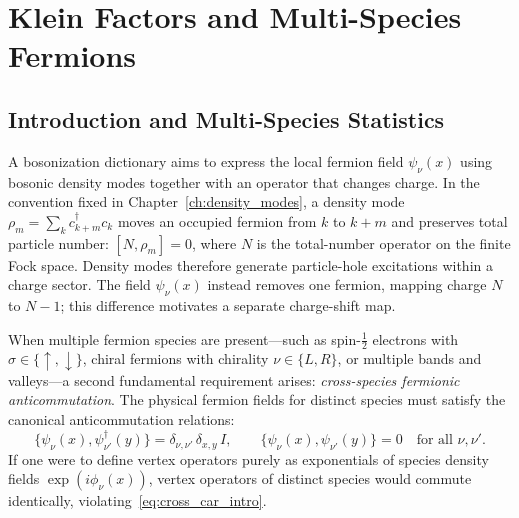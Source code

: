 \chapter{Klein Factors and Multi-Species Fermions}
\label{ch:klein_factors}

\section{Introduction and Multi-Species Statistics}

A bosonization dictionary aims to express the local fermion field $\psi_\nu(x)$ using bosonic density modes together with an operator that changes charge. In the convention fixed in Chapter~\ref{ch:density_modes}, a density mode $\rho_m=\sum_k c_{k+m}^\dagger c_k$ moves an occupied fermion from $k$ to $k+m$ and preserves total particle number: $[N,\rho_m]=0$, where $N$ is the total-number operator on the finite Fock space. Density modes therefore generate particle-hole excitations within a charge sector. The field $\psi_\nu(x)$ instead removes one fermion, mapping charge $N$ to $N-1$; this difference motivates a separate charge-shift map.

When multiple fermion species are present---such as spin-$\frac{1}{2}$ electrons with $\sigma \in \{\uparrow, \downarrow\}$, chiral fermions with chirality $\nu \in \{L, R\}$, or multiple bands and valleys---a second fundamental requirement arises: \emph{cross-species fermionic anticommutation}. The physical fermion fields for distinct species must satisfy the canonical anticommutation relations:
\begin{equation}
\label{eq:cross_car_intro}
\{\psi_\nu(x), \psi_{\nu'}^\dagger(y)\} = \delta_{\nu, \nu'}\, \delta_{x, y}\, I, \qquad \{\psi_\nu(x), \psi_{\nu'}(y)\} = 0 \quad \text{for all } \nu, \nu'.
\end{equation}
If one were to define vertex operators purely as exponentials of species density fields $\exp(i \phi_\nu(x))$, vertex operators of distinct species would commute identically, violating~\eqref{eq:cross_car_intro}.

